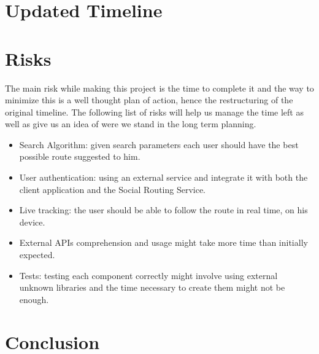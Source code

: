 \documentclass{article}
\begin{document}
    \section{Updated Timeline}
        \begin{figure}[H]
        \end{figure}
        \newpage

    \section{Risks}

        The main risk while making this project is the time to complete it and the way to minimize this is a well thought plan of action, hence the restructuring of the original timeline.
        The following list of risks will help us manage the time left as well as give us an idea of were we stand in the long term planning.

        \begin{itemize}
            \item Search Algorithm: given search parameters each user should have the best possible route suggested to him.  
            \item User authentication: using an external service and integrate it with both the client application and the Social Routing Service.
            \item Live tracking: the user should be able to follow the route in real time, on his device.
            \item External APIs comprehension and usage might take more time than initially expected.
            \item Tests: testing each component correctly might involve using external unknown libraries and the time necessary to create them might not be enough. 
        \end{itemize}
    
        \newpage    
    
    \section{Conclusion}
    
        \newpage    
    
    \printbibliography
\end{document}
